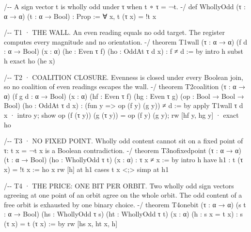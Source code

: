 \documentclass[10pt]{article}
\renewcommand{\_}{\origunderscore\allowbreak}
\newenvironment{Shaded}{}{}
\newcommand{\NormalTok}[1]{#1}
\begin{document}
\begin{Shaded}
\begin{Highlighting}[]
\NormalTok{/{-}{-} A sign vector t is wholly odd under τ when t ∘ τ = ¬t. {-}/}
\NormalTok{def WhollyOdd (τ : α → α) (t : α → Bool) : Prop := ∀ x, t (τ x) = !t x}

\NormalTok{/{-}{-} T1 · THE WALL.}
\NormalTok{    An even reading equals no odd target. The register computes every}
\NormalTok{    magnitude and no orientation. {-}/}
\NormalTok{theorem T1\_wall (τ : α → α) (f d : α → Bool) (x : α)}
\NormalTok{    (he : Even τ f) (ho : OddAt τ d x) : f ≠ d := by}
\NormalTok{  intro h}
\NormalTok{  subst h}
\NormalTok{  exact ho (he x)}

\NormalTok{/{-}{-} T2 · COALITION CLOSURE.}
\NormalTok{    Evenness is closed under every Boolean join, so no coalition of even}
\NormalTok{    readings escapes the wall. {-}/}
\NormalTok{theorem T2\_coalition (τ : α → α) (f g d : α → Bool) (x : α)}
\NormalTok{    (hf : Even τ f) (hg : Even τ g) (op : Bool → Bool → Bool)}
\NormalTok{    (ho : OddAt τ d x) : (fun y =\textgreater{} op (f y) (g y)) ≠ d := by}
\NormalTok{  apply T1\_wall τ \_ d x}
\NormalTok{  · intro y; show op (f (τ y)) (g (τ y)) = op (f y) (g y); rw [hf y, hg y]}
\NormalTok{  · exact ho}

\NormalTok{/{-}{-} T3 · NO FIXED POINT.}
\NormalTok{    Wholly odd content cannot sit on a fixed point of τ:}
\NormalTok{    t x = ¬t x is a Boolean contradiction. {-}/}
\NormalTok{theorem T3\_no\_fixed\_point (τ : α → α) (t : α → Bool)}
\NormalTok{    (ho : WhollyOdd τ t) (x : α) : τ x ≠ x := by}
\NormalTok{  intro h}
\NormalTok{  have h1 : t (τ x) = !t x := ho x}
\NormalTok{  rw [h] at h1}
\NormalTok{  cases t x \textless{};\textgreater{} simp at h1}

\NormalTok{/{-}{-} T4 · THE PRICE: ONE BIT PER ORBIT.}
\NormalTok{    Two wholly odd sign vectors agreeing at one point of an orbit agree on}
\NormalTok{    the whole orbit. The odd content of a free orbit is exhausted by one}
\NormalTok{    binary choice. {-}/}
\NormalTok{theorem T4\_one\_bit (τ : α → α) (s t : α → Bool)}
\NormalTok{    (hs : WhollyOdd τ s) (ht : WhollyOdd τ t)}
\NormalTok{    (x : α) (h : s x = t x) : s (τ x) = t (τ x) := by}
\NormalTok{  rw [hs x, ht x, h]}


\end{Highlighting}
\end{Shaded}
\end{document}
